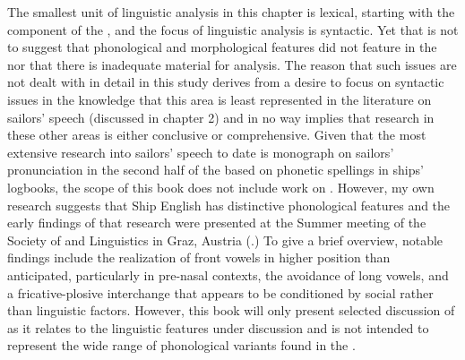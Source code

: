 The smallest unit of linguistic analysis in this chapter is lexical, starting with the  component of the , and the focus of linguistic analysis is syntactic. Yet that is not to suggest that phonological and morphological features did not feature in the  nor that there is inadequate material for analysis. The reason that such issues are not dealt with in detail in this study derives from a desire to focus on syntactic issues in the knowledge that this area is least represented in the literature on sailors’ speech (discussed in chapter 2) and in no way implies that research in these other areas is either conclusive or comprehensive. Given that the most extensive research into sailors’ speech to date is  monograph on sailors’ pronunciation in the second half of the  based on phonetic spellings in ships’ logbooks, the scope of this book does not include work on . However, my own research suggests that Ship English has distinctive phonological features and the early findings of that research were presented at the Summer meeting of the Society of  and  Linguistics in Graz, Austria (\citealt{Delgado2015}.) To give a brief overview, notable findings include the realization of front vowels in higher position than anticipated, particularly in pre-nasal contexts, the avoidance of long vowels, and a fricative-plosive interchange that appears to be conditioned by social rather than linguistic factors. However, this book will only present selected discussion of  as it relates to the linguistic features under discussion and is not intended to represent the wide range of phonological variants found in the . 

